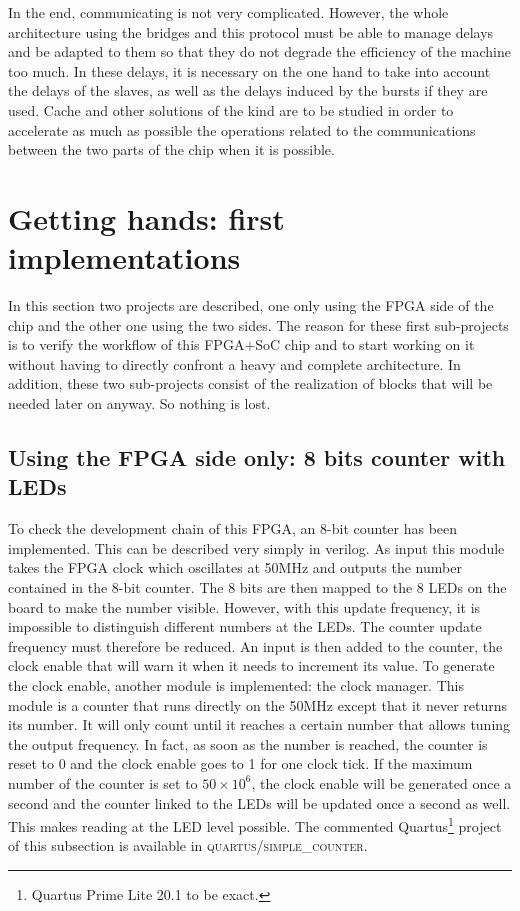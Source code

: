 \documentclass[12pt]{article}
\begin{document}
In the end, communicating is not very complicated. However, the whole architecture using the bridges and this protocol must be able to manage delays and be adapted to them so that they do not degrade the efficiency of the machine too much. In these delays, it is necessary on the one hand to take into account the delays of the slaves, as well as the delays induced by the bursts if they are used. Cache and other solutions of the kind are to be studied in order to accelerate as much as possible the operations related to the communications between the two parts of the chip when it is possible.

\section{Getting hands: first implementations}

In this section two projects are described, one only using the FPGA side of the chip and the other one using the two sides. The reason for these first sub-projects is to verify the workflow of this
FPGA+SoC chip and to start working on it without having to directly confront a heavy and complete architecture. In addition, these two sub-projects consist of the realization of blocks that will be needed later on anyway. So nothing is lost.

\subsection{Using the FPGA side only: 8 bits counter with LEDs}

To check the development chain of this FPGA, an 8-bit counter has been implemented. This can be described very simply in verilog. As input this module takes the FPGA clock which oscillates at 50MHz and outputs the number contained in the 8-bit counter. The 8 bits are then mapped to the 8 LEDs on the board to make the number visible. However, with this update frequency, it is impossible to distinguish different numbers at the LEDs. The counter update frequency must therefore be reduced. An input is then added to the counter, the clock enable that will warn it when it needs to increment its value. To generate the clock enable, another module is implemented: the clock manager. This module is a counter that runs directly on the 50MHz except that it never returns its number. It will only count until it reaches a certain number that allows tuning the output frequency. In fact, as soon as the number is reached, the counter is reset to 0 and the clock enable goes to 1 for one clock tick. If the maximum number of the counter is set to $50 \times 10^6$, the clock enable will be generated once a second and the counter linked to the LEDs will be updated once a second as well. This makes reading at the LED level possible. The commented Quartus\footnote{Quartus Prime Lite 20.1 to be exact.} project of this subsection is available in \textsc{quartus/simple\_counter}.
\end{document}
